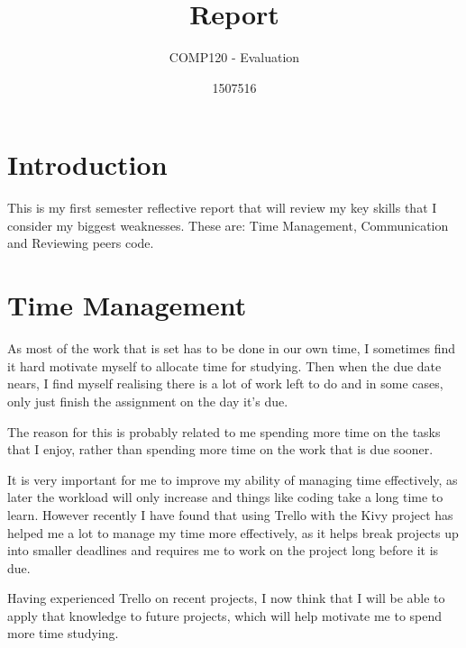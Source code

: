 \documentclass{scrartcl}
\title{Report}
\subtitle{COMP120 - Evaluation}
\author{1507516}
\begin{document}
\maketitle

\section{Introduction}
This is my first semester reflective report that will review my key skills that I consider my biggest weaknesses. These are: Time Management, Communication and Reviewing peers code.

\section{Time Management}

As most of the work that is set has to be done in our own time, I sometimes find it hard motivate myself to allocate time for studying. Then when the due date nears, I find myself realising there is a lot of work left to do and in some cases, only just finish the assignment on the day it's due.

The reason for this is probably related to me spending more time on the tasks that I enjoy, rather than spending more time on the work that is due sooner. 

It is very important for me to improve my ability of managing time effectively, as later the workload will only increase and things like coding take a long time to learn. However recently I have found that using Trello with the Kivy project has helped me a lot to manage my time more effectively, as it helps break projects up into smaller deadlines and requires me to work on the project long before it is due.

Having experienced Trello on recent projects, I now think that I will be able to apply that knowledge to future projects, which will help motivate me to spend more time studying. 
\end{document}
